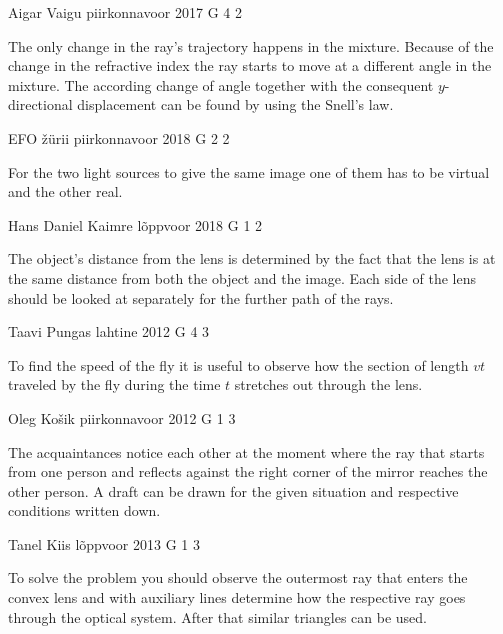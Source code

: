 \documentclass[11pt]{article}
\begin{document}
{Aigar Vaigu} %
{piirkonnavoor} %
{2017} %
{G 4} %
{2} %
{

\ifEngHint
The only change in the ray’s trajectory happens in the mixture. Because of the change in the refractive index the ray starts to move at a different angle in the mixture. The according change of angle together with the consequent $y$-directional displacement can be found by using the Snell's law.
\fi
}

{EFO žürii} %
{piirkonnavoor} %
{2018} %
{G 2} %
{2} %
{

\ifEngHint
For the two light sources to give the same image one of them has to be virtual and the other real.
\fi
}

{Hans Daniel Kaimre} %
{lõppvoor} %
{2018} %
{G 1} %
{2} %
{

\ifEngHint
The object's distance from the lens is determined by the fact that the lens is at the same distance from both the object and the image. Each side of the lens should be looked at separately for the further path of the rays.
\fi
}

{Taavi Pungas} %
{lahtine} %
{2012} %
{G 4} %
{3} %
{

\ifEngHint
To find the speed of the fly it is useful to observe how the section of length $vt$ traveled by the fly during the time $t$ stretches out through the lens.
\fi
}

{Oleg Košik} %
{piirkonnavoor} %
{2012} %
{G 1} %
{3} %
{

\ifEngHint
The acquaintances notice each other at the moment where the ray that starts from one person and reflects against the right corner of the mirror reaches the other person. A draft can be drawn for the given situation and respective conditions written down.
\fi
}

{Tanel Kiis} %
{lõppvoor} %
{2013} %
{G 1} %
{3} %
{

\ifEngHint
To solve the problem you should observe the outermost ray that enters the convex lens and with auxiliary lines determine how the respective ray goes through the optical system. After that similar triangles can be used.
\fi
}
\end{document}
